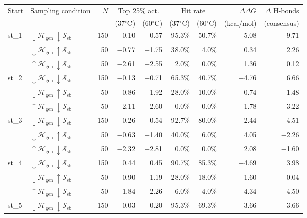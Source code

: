 \begin{tabular}{llrrrrrrr}
\toprule
Start & Sampling condition & $N$ & \multicolumn{2}{c}{Top 25\% act.} & \multicolumn{2}{c}{Hit rate} & $\Delta\Delta G$ & $\Delta$ H-bonds \\
 &  & & (37$^\circ$C) & (60$^\circ$C) & (37$^\circ$C) & (60$^\circ$C) & (kcal/mol) & (consensus) \\
\midrule
st\_1 & $\downarrow \mathcal{H}_\mathrm{gen}\ \downarrow \mathcal{S}_\mathrm{sb}$ & 150 & $-$0.10 & $-$0.57 & 95.3\% & 50.7\% & $-$5.08 & 9.71 \\
 & $\downarrow \mathcal{H}_\mathrm{gen}\ \uparrow \mathcal{S}_\mathrm{sb}$ & 50 & $-$0.77 & $-$1.75 & 38.0\% & 4.0\% & 0.34 & 2.26 \\
 & $\uparrow \mathcal{H}_\mathrm{gen}\ \downarrow \mathcal{S}_\mathrm{sb}$ & 50 & $-$2.61 & $-$2.55 & 2.0\% & 0.0\% & 1.36 & 0.12 \\
\midrule
st\_2 & $\downarrow \mathcal{H}_\mathrm{gen}\ \downarrow \mathcal{S}_\mathrm{sb}$ & 150 & $-$0.13 & $-$0.71 & 65.3\% & 40.7\% & $-$4.76 & 6.66 \\
 & $\downarrow \mathcal{H}_\mathrm{gen}\ \uparrow \mathcal{S}_\mathrm{sb}$ & 50 & $-$0.86 & $-$1.92 & 28.0\% & 10.0\% & $-$0.74 & 1.48 \\
 & $\uparrow \mathcal{H}_\mathrm{gen}\ \downarrow \mathcal{S}_\mathrm{sb}$ & 50 & $-$2.11 & $-$2.60 & 0.0\% & 0.0\% & 1.78 & $-$3.22 \\
\midrule
st\_3 & $\downarrow \mathcal{H}_\mathrm{gen}\ \downarrow \mathcal{S}_\mathrm{sb}$ & 150 & 0.26 & 0.54 & 92.7\% & 80.0\% & $-$2.44 & 4.51 \\
 & $\downarrow \mathcal{H}_\mathrm{gen}\ \uparrow \mathcal{S}_\mathrm{sb}$ & 50 & $-$0.63 & $-$1.40 & 40.0\% & 6.0\% & 4.05 & $-$2.26 \\
 & $\uparrow \mathcal{H}_\mathrm{gen}\ \downarrow \mathcal{S}_\mathrm{sb}$ & 50 & $-$2.32 & $-$2.81 & 0.0\% & 0.0\% & 2.08 & $-$1.60 \\
\midrule
st\_4 & $\downarrow \mathcal{H}_\mathrm{gen}\ \downarrow \mathcal{S}_\mathrm{sb}$ & 150 & 0.44 & 0.45 & 90.7\% & 85.3\% & $-$4.69 & 3.98 \\
 & $\downarrow \mathcal{H}_\mathrm{gen}\ \uparrow \mathcal{S}_\mathrm{sb}$ & 50 & $-$0.90 & $-$1.19 & 28.0\% & 18.0\% & $-$1.60 & $-$0.04 \\
 & $\uparrow \mathcal{H}_\mathrm{gen}\ \downarrow \mathcal{S}_\mathrm{sb}$ & 50 & $-$1.84 & $-$2.26 & 6.0\% & 4.0\% & 4.34 & $-$4.50 \\
\midrule
st\_5 & $\downarrow \mathcal{H}_\mathrm{gen}\ \downarrow \mathcal{S}_\mathrm{sb}$ & 150 & 0.03 & $-$0.20 & 95.3\% & 69.3\% & $-$3.66 & 3.66 \\

\end{tabular}
